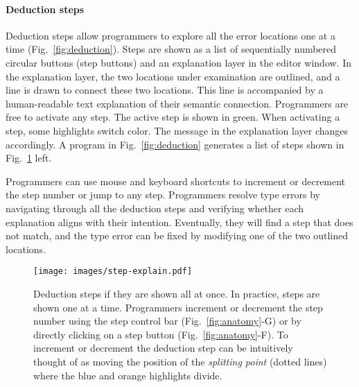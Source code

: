 \paragraph{Deduction steps}  \label{sub:deduction-steps}



Deduction steps allow programmers to explore all the error locations one at a time (Fig.~\ref{fig:deduction}). Steps are shown as a list of sequentially numbered circular buttons (step buttons) and an explanation layer in the editor window. In the explanation layer, the two locations under examination are outlined, and a line is drawn to connect these two locations. This line is accompanied by a human-readable text explanation of their semantic connection. Programmers are free to activate any step. The active step is shown in green. When activating a step, some highlights switch color. The message in the explanation layer changes accordingly. A program in Fig.~\ref{fig:deduction} generates a list of steps shown in Fig.~\ref{fig:step-interface} left.


Programmers can use mouse and keyboard shortcuts to increment or decrement the step number or jump to any step. Programmers resolve type errors by navigating through all the deduction steps and verifying whether each explanation aligns with their intention. Eventually, they will find a step that does not match, and the type error can be fixed by modifying one of the two outlined locations.

\begin{figure}[ht]
    \centering
    \texttt{[image: images/step-explain.pdf]}
    \caption[Deduction steps if they are shown all at once]{
Deduction steps if they are shown all at once. In practice, steps are shown one at a time. Programmers increment or decrement the step number using the step control bar (Fig.~\ref{fig:anatomy}-G) or by directly clicking on a step button (Fig.~\ref{fig:anatomy}-F). To increment or decrement the deduction step can be intuitively thought of as moving the position of the \textit{splitting point} (dotted lines) where the blue and orange highlights divide.
        }
    \label{fig:step-interface}
\end{figure}

